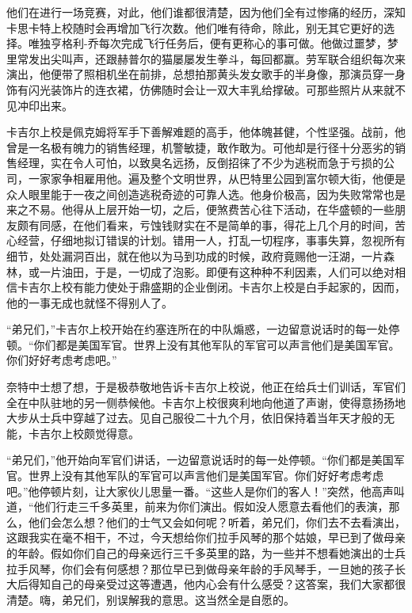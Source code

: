     他们在进行一场竞赛，对此，他们谁都很清楚，因为他们全有过惨痛的经历，深知卡思卡特上校随时会再增加飞行次数。他们唯有待命，除此，别无其它更好的选择。唯独亨格利-乔每次完成飞行任务后，便有更称心的事可做。他做过噩梦，梦里常发出尖叫声，还跟赫普尔的猫屡屡发生拳斗，每回都赢。劳军联合组织每次来演出，他便带了照相机坐在前排，总想拍那黄头发女歌手的半身像，那演员穿一身饰有闪光装饰片的连衣裙，仿佛随时会让一双大丰乳给撑破。可那些照片从来就不见冲印出来。

    卡吉尔上校是佩克姆将军手下善解难题的高手，他体魄甚健，个性坚强。战前，他曾是一名极有魄力的销售经理，机警敏捷，敢作敢为。可他却是行径十分恶劣的销售经理，实在令人可怕，以致臭名远扬，反倒招徕了不少为逃税而急于亏损的公司，一家家争相雇用他。遍及整个文明世界，从巴特里公园到富尔顿大街，他便是众人眼里能于一夜之间创造逃税奇迹的可靠人选。他身价极高，因为失败常常也是来之不易。他得从上层开始一切，之后，便煞费苦心往下活动，在华盛顿的一些朋友颇有同感，在他们看来，亏蚀钱财实在不是简单的事，得花上几个月的时间，苦心经营，仔细地拟订错误的计划。错用一人，打乱一切程序，事事失算，忽视所有细节，处处漏洞百出，就在他以为马到功成的时候，政府竟赐他一汪湖，一片森林，或一片油田，于是，一切成了泡影。即便有这种种不利因素，人们可以绝对相信卡吉尔上校有能力使处于鼎盛期的企业倒闭。卡吉尔上校是白手起家的，因而，他的一事无成也就怪不得别人了。

    “弟兄们，”卡吉尔上校开始在约塞连所在的中队煽惑，一边留意说话时的每一处停顿。“你们都是美国军官。世界上没有其他军队的军官可以声言他们是美国军官。你们好好考虑考虑吧。”

    奈特中士想了想，于是极恭敬地告诉卡吉尔上校说，他正在给兵士们训话，军官们全在中队驻地的另一侧恭候他。卡吉尔上校很爽利地向他道了声谢，使得意扬扬地大步从士兵中穿越了过去。见自己服役二十九个月，依旧保持着当年天才般的无能，卡吉尔上校颇觉得意。
 


    “弟兄们，”他开始向军官们讲话，一边留意说话时的每一处停顿。“你们都是美国军官。世界上没有其他军队的军官可以声言他们是美国军官。你们好好考虑考虑吧。”他停顿片刻，让大家伙儿思量一番。“这些人是你们的客人！”突然，他高声叫道，“他们行走三千多英里，前来为你们演出。假如没人愿意去看他们的表演，那么，他们会怎么想？他们的士气又会如何呢？听着，弟兄们，你们去不去看演出，这跟我实在毫不相干，不过，今天想给你们拉手风琴的那个姑娘，早已到了做母亲的年龄。假如你们自己的母亲远行三千多英里的路，为一些并不想看她演出的士兵拉手风琴，你们会有何感想？那位早已到做母亲年龄的手风琴手，一旦她的孩子长大后得知自己的母亲受过这等遭遇，他内心会有什么感受？这答案，我们大家都很清楚。嗨，弟兄们，别误解我的意思。这当然全是自愿的。

